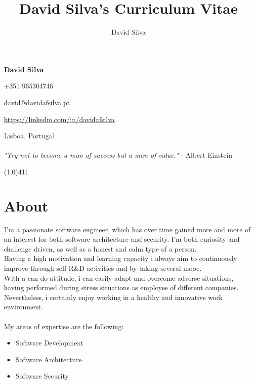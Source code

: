 \documentclass[10pt]{article}
\title{David Silva's Curriculum Vitae}
\author{David Silva}
\newenvironment{listing}{
 \begin{itemize}
  \setlength{\itemsep}{1pt}
  \setlength{\parskip}{0pt}
  \setlength{\parsep}{0pt}
}{\end{itemize}}
\begin{document}
\pagestyle{fancy}

\begin{minipage}[ht]{0.46\textwidth}
	\vspace{-5mm}\Huge{\textbf{David Silva}}
\end{minipage}
\begin{minipage}[ht]{0.46\textwidth}
\hfill +351 965304746

\hfill \href{mailto:david@davidafsilva.pt}{david@davidafsilva.pt}


\hfill \url{https://linkedin.com/in/davidafsilva}
\end{minipage}

\begin{minipage}[ht]{0.925\textwidth}
\vspace{-3mm} Lisboa, Portugal\\\\
\vspace{0 mm} \hfill\footnotesize{
    \textit{"Try not to become a man of success but a man of value."} - Albert Einstein
}
\vspace{0.5mm}
\end{minipage}

\line(1,0){411}

\section*{About}
I'm a passionate software engineer, which has over time gained more and more of an interest for both software architecture and security. I'm both curiosity and challenge driven, as well as a honest and calm type of a person.\\
Having a high motivation and learning capacity i always aim to continuously improve through self R\&D activities and by taking several \gls{mooc}. \\
With a can-do attitude, i can easily adapt and overcome adverse situations, having performed during stress situations as employee of different companies.
Nevertheless, i certainly enjoy working in a healthy and innovative work environment.\\\\
My areas of expertise are the following:
\begin{listing}
	\item Software Development
	\item Software Architecture
	\item Software Security
\end{listing}
\end{document}
